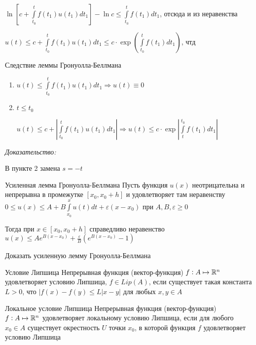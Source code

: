 \documentclass[12pt]{article}
\begin{document}
$\ln\left[ c + \int\limits_{t_0}^t f(t_1)u(t_1)dt_1 \right] - \ln c \leq \int\limits_{t_0}^t f(t_1)dt_1$, отсюда и из неравенства 

$u(t) \leq c + \int\limits_{t_0}^t f(t_1)u(t_1)dt_1 \leq c \cdot \exp(\int\limits_{t_0}^t f(t_1)dt_1)$, чтд

\begin{theo}{Следствие леммы Гронуолла-Беллмана}
    \begin{enumerate}
        \item $u(t) \leq \int\limits_{t_0}^t f(t_1)u(t_1)dt_1 \Rightarrow u(t) \equiv 0$
        \item $t \leq t_0$
        
        $u(t) \leq c + \left| \int\limits_{t_0}^t f(t_1)u(t_1)dt_1 \right| \Rightarrow u(t) \leq c \cdot \exp\left| \int\limits_t^{t_0} f(t_1)dt_1 \right|$
    \end{enumerate}
\end{theo}

\textit{Доказательство:}

В пункте 2 замена $s = -t$ 

\begin{lem}{Усиленная лемма Гронуолла-Беллмана}
    Пусть функция $u(x)$ неотрицательна и непрерывна в промежутке $[x_0, x_0 + h]$ и удовлетворяет там неравенству $0 \leq u(x) \leq A + B \int\limits_{x_0}^x u(t)dt + \varepsilon(x - x_0)$ при $A, B, \varepsilon \geq 0$

    Тогда при $x \in [x_0, x_0 + h]$ справедливо неравенство $u(x) \leq Ae^{B(x - x_0)} + \frac{\varepsilon}{B}(e^{B(x - x_0)} - 1)$
\end{lem}

\begin{Exercise}{}
    Доказать усиленную лемму Гронуолла-Беллмана
\end{Exercise}

\begin{defin}{Условие Липшица}
    Непрерывная функция (вектор-функция) $f : A \mapsto \mathbb R^n$ удовлетворяет условию Липшица, $f \in Lip(A)$, если существует такая константа $L > 0$, что $|f(x) - f(y) \leq L|x - y|$ для любых $x, y \in A$
\end{defin}

\begin{defin}{Локальное условие Липшица}
    Непрерывная функция (вектор-функция) $f : A \mapsto \mathbb R^n$ удовлетворяет локальному условию Липшица, если для любого $x_0 \in A$ существует окрестность $U$ точки $x_0$, в которой функция $f$ удовлетворяет условию Липшица
\end{defin}
\end{document}
